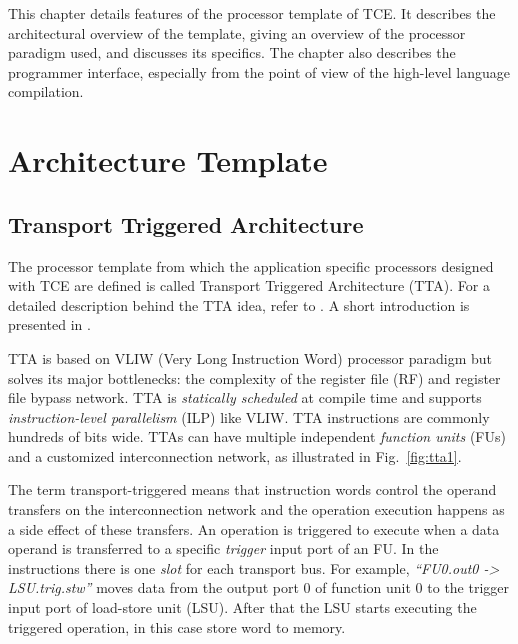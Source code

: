 \documentclass[twoside]{tceusermanual}
\begin{document}
This chapter details features of the processor template of TCE.
It describes the architectural overview of the template, giving 
an overview of the processor paradigm used, and discusses
its specifics. The chapter also describes the programmer interface, 
especially from the point of view of the high-level language 
compilation.

\section{Architecture Template}

\subsection{Transport Triggered Architecture} 

The processor template from which the application specific processors
designed with TCE are defined is called Transport Triggered
Architecture (TTA). For a detailed description behind the TTA
idea, refer to \cite{HCorp97}. A short introduction is presented
in \cite{boutellier11}.

TTA is based on VLIW (Very Long Instruction Word) processor paradigm
but solves its major bottlenecks: the complexity of the register file (RF)
and register file bypass network. TTA is \textit{statically
scheduled} at compile time and supports \textit{instruction-level
parallelism} (ILP) like VLIW. TTA instructions are commonly hundreds of
bits wide. TTAs can have multiple independent \textit{function units} (FUs) and
a customized interconnection network, as illustrated in Fig.~\ref{fig:tta1}.

The term transport-triggered means that instruction words control the
operand transfers on the interconnection network and the operation
execution happens as a side effect of these transfers. An operation is
triggered to execute when a data operand is transferred to a specific
\textit{trigger} input port of an FU. In the instructions there is one
\textit{slot} for each transport bus. For example, \textit{``FU0.out0
  -> LSU.trig.stw''} moves data from the output port $0$ of function
unit $0$ to the trigger input port of load-store unit (LSU). After
that the LSU starts executing the triggered operation, in this case
store word to memory. 
\end{document}
